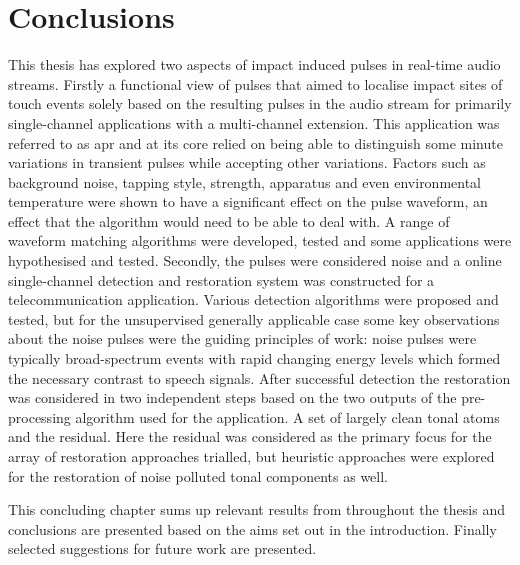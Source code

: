 \def\baselinestretch{1}
\chapter{Conclusions}\label{ch:Conclusions}
\ifpdf
    \graphicspath{{Conclusions/ConclusionsFigs/PNG/}{Conclusions/ConclusionsFigs/PDF/}{Conclusions/ConclusionsFigs/}}
\else
    \graphicspath{{Conclusions/ConclusionsFigs/EPS/}{Conclusions/ConclusionsFigs/}}
\fi

\def\baselinestretch{1.6}


This thesis has explored two aspects of impact induced pulses in real-time audio streams. Firstly a functional view of pulses that aimed to localise impact sites of touch events solely based on the resulting pulses in the audio stream for primarily single-channel applications with a multi-channel extension. This application was referred to as \gls{apr} and at its core relied on being able to distinguish some minute variations in transient pulses while accepting other variations. Factors such as background noise, tapping style, strength, apparatus and even environmental temperature were shown to have a significant effect on the pulse waveform, an effect that the algorithm would need to be able to deal with. A range of waveform matching algorithms were developed, tested and some applications were hypothesised and tested.
Secondly, the pulses were considered noise and a online single-channel detection and restoration system was constructed for a telecommunication application. Various detection algorithms were proposed and tested, but for the unsupervised generally applicable case some key observations about the noise pulses were the guiding principles of work: noise pulses were typically broad-spectrum events with rapid changing energy levels which formed the necessary contrast to speech signals. After successful detection the restoration was considered in two independent steps based on the two outputs of the pre-processing algorithm used for the application. A set of largely clean tonal atoms and the residual. Here the residual was considered as the primary focus for the array of restoration approaches trialled, but heuristic approaches were explored for the restoration of noise polluted tonal components as well.

This concluding chapter sums up relevant results from throughout the thesis and conclusions are presented based on the aims set out in the introduction. Finally selected suggestions for future work are presented.

